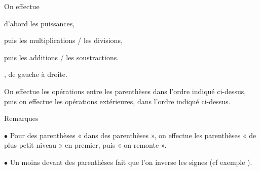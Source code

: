 \ifdefined\COMPLETE
\else
    
    
\fi

          \vspace*{-1.2cm}       
                 


\begin{labeling}{On effectue }
\item [On effectue ] d'abord les puissances,
\item [] puis les multiplications / les divisions, 
\item [] puis les additions / les soustractions.
\end{labeling}

, de gauche à droite.

\bigskip 


\medskip

On effectue les opérations entre les parenthèses dans l'ordre indiqué ci-dessus, puis on effectue les opérations extérieures, dans l'ordre  indiqué ci-dessus.

\begin{labeling}{Remarques} 
\item[Remarques] $\bullet$ Pour des parenthèses « dans des parenthèses », on effectue les parenthèses « de plus petit niveau » en premier, puis « on remonte ».
\item [] $\bullet$ Un moins devant des parenthèses fait que l'on inverse les signes (cf exemple  {\large {}}).
\end{labeling} 

                     


\bigskip 

                 \centerline{}   
\medskip 
   

